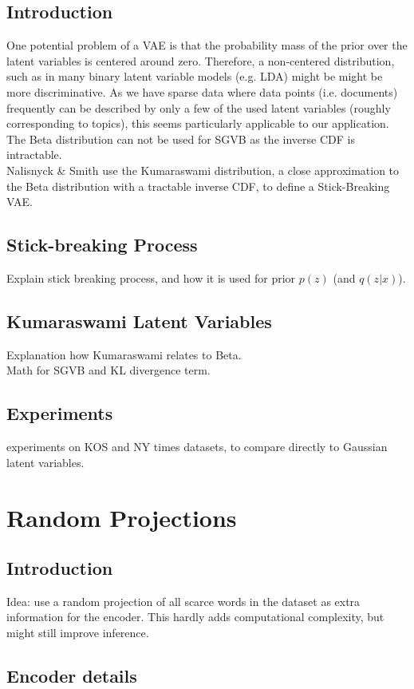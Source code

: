 \documentclass{report}
\begin{document}
\section{Introduction}
One potential problem of a VAE is that the probability mass of the prior over the latent variables is centered around zero. Therefore, a non-centered distribution, such as in many binary latent variable models (e.g. LDA) might be might be more discriminative. As we have sparse data where data points (i.e. documents) frequently can be described by only a few of the used latent variables (roughly corresponding to topics), this seems particularly applicable to our application.  \\
The Beta distribution can not be used for SGVB as the inverse CDF is intractable. \\
Nalisnyck \& Smith use the Kumaraswami distribution, a close approximation to the Beta distribution with a tractable inverse CDF, to define a Stick-Breaking VAE. \\

\section{Stick-breaking Process}
Explain stick breaking process, and how it is used for prior $p(z)$ (and $q(z|x)$).
\section{Kumaraswami Latent Variables} 
Explanation how Kumaraswami relates to Beta. 
\\
Math for SGVB and KL divergence term.
\section{Experiments}
experiments on KOS and NY times datasets, to compare directly to Gaussian latent variables.
\chapter{Random Projections}
\section{Introduction}
Idea: use a random projection of all scarce words in the dataset as extra information for the encoder. This hardly adds computational complexity, but might still improve inference.
\section{Encoder details}
\end{document}
